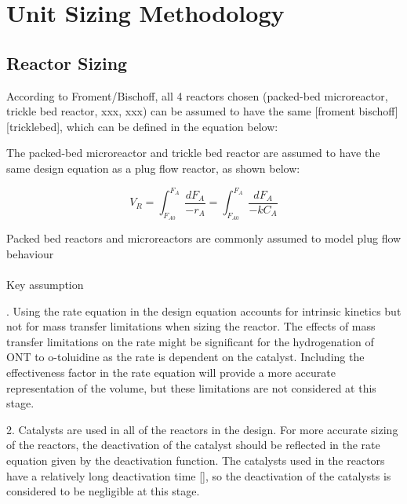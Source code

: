 \section{Unit Sizing Methodology}
\label{app:sizing}
\subsection{Reactor Sizing}
According to Froment/Bischoff, all 4 reactors chosen (packed-bed microreactor, trickle bed reactor, xxx, xxx) can be assumed to have the same [froment bischoff][tricklebed], which can be defined in the equation below:

The packed-bed microreactor and trickle bed reactor are assumed to have the same design equation as a plug flow reactor, as shown below:

\begin{equation}
    V_R = \int_{F_{A0}}^{F_{A}} \frac{dF_A}{-r_A} = \int_{F_{A0}}^{F_{A}} \frac{dF_A}{-kC_A}
    \label{reactor_sizing}
\end{equation}

Packed bed reactors and microreactors are commonly assumed to model plug flow behaviour 

\paragraph{}{Key assumption}
 
.  Using the rate equation in the design equation accounts for intrinsic kinetics but not for mass transfer limitations when sizing the reactor. The effects of mass transfer limitations on the rate might be significant for the hydrogenation of ONT to o-toluidine as the rate is dependent on the catalyst. Including the effectiveness factor in the rate equation will provide a more accurate representation of the volume, but these limitations are not considered at this stage.

2.  Catalysts are used in all of the reactors in the design. For more accurate sizing of the reactors, the deactivation of the catalyst should be reflected in the rate equation given by the deactivation function. The catalysts used in the reactors have a relatively long deactivation time [], so the deactivation of the catalysts is considered to be negligible at this stage. 

